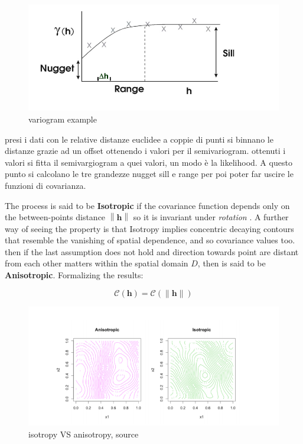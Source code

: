 \documentclass[
  12pt,
  a4paper,
  oneside]{book}
\begin{document}
\begin{figure}
\centering
\includegraphics{images/variogram.png}
\caption{variogram example}
\end{figure}

presi i dati con le relative distanze euclidee a coppie di punti si binnano le distanze grazie ad un offset ottenendo i valori per il semivariogram. ottenuti i valori si fitta il semivargiogram a quei valori, un modo è la likelihood. A questo punto si calcolano le tre grandezze nugget sill e range per poi poter far uscire le funzioni di covarianza.

The process is said to be \textbf{Isotropic} if the covariance function depends only on the between-points distance \(\left\|\mathbf{h}\right\|\) so it is invariant under \emph{rotation} \citeyearpar{Krainski-Rubio}. A further way of seeing the property is that Isotropy implies concentric decaying contours that resemble the vanishing of spatial dependence, and so covariance values too.
then if the last assumption does not hold and direction towards point are distant from each other matters within the spatial domain \(D\), then is said to be \textbf{Anisotropic}.
Formalizing the results:

\[\mathcal{C}(\mathbf{h})=\mathcal{C}(\|\mathbf{h}\|)\]

\begin{figure}
\centering
\includegraphics{images/isotropyVSanisotropy.png}
\caption{isotropy VS anisotropy, source \citet{blanchetscalliet}}
\end{figure}
\end{document}
